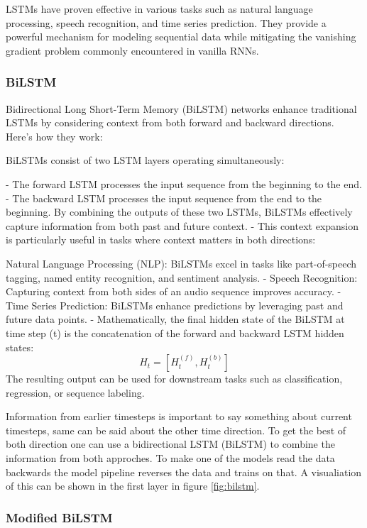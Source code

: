 LSTMs have proven effective in various tasks such as natural language processing, speech recognition, and time series prediction. They provide a powerful mechanism for modeling sequential data while mitigating the vanishing gradient problem commonly encountered in vanilla RNNs.

\subsubsection{BiLSTM}

Bidirectional Long Short-Term Memory (BiLSTM) networks enhance traditional LSTMs by considering context from both forward and backward directions. Here’s how they work:

BiLSTMs consist of two LSTM layers operating simultaneously:

- The forward LSTM processes the input sequence from the beginning to the end.
- The backward LSTM processes the input sequence from the end to the beginning. By combining the outputs of these two LSTMs, BiLSTMs effectively capture information from both past and future context.
- This context expansion is particularly useful in tasks where context matters in both directions:

Natural Language Processing (NLP): BiLSTMs excel in tasks like part-of-speech tagging, named entity recognition, and sentiment analysis.
- Speech Recognition: Capturing context from both sides of an audio sequence improves accuracy.
- Time Series Prediction: BiLSTMs enhance predictions by leveraging past and future data points.
- Mathematically, the final hidden state of the BiLSTM at time step (t) is the concatenation of the forward and backward LSTM hidden states: \[ H_t = [H_t^{(f)}, H_t^{(b)}] \] The resulting output can be used for downstream tasks such as classification, regression, or sequence labeling.

Information from earlier timesteps is important to say something about current timesteps, same can be said about the other time direction. To get the best of both direction one can use a bidirectional LSTM (BiLSTM) to combine the information from both approches. To make one of the models read the data backwards the model pipeline reverses the data and trains on that. A visualiation of this can be shown in the first layer in figure \ref{fig:bilstm}.

\subsubsection{Modified BiLSTM}

